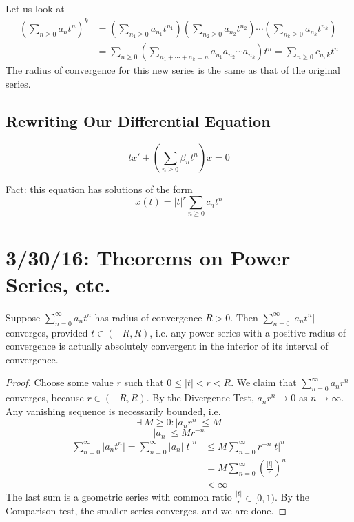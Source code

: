 \documentclass[12pt]{article}
\begin{document}
Let us look at \[ 
\begin{aligned}
\left(\sum_{n\ge0}a_nt^n\right)^k &= \left(\sum_{n_1\ge0}a_{n_1}t^{n_1}\right)\left(\sum_{n_2\ge0}a_{n_2}t^{n_2}\right)\cdots\left(\sum_{n_k\ge0}a_{n_k}t^{n_k}\right) \\
&= \sum_{n\ge 0}\left(\sum_{n_1 + \cdots + n_k = n}a_{n_1}a_{n_2}\cdots a_{n_k}\right)t^n = \sum_{n \ge 0}c_{n,k}t^n
\end{aligned}
\]
The radius of convergence for this new series is the same as that of the original series.

\subsection{Rewriting Our Differential Equation}
\[ tx' + \left(\sum_{n\ge0}\beta_nt^n\right)x = 0 \]

Fact: this equation has solutions of the form \[ x(t) = |t|^r\sum_{n\ge0}c_nt^n \]

\section{3/30/16: Theorems on Power Series, etc.}
\begin{theorem}
Suppose $\displaystyle\sum_{n=0}^{\infty}a_nt^n$ has radius of convergence $R > 0$. Then $\displaystyle\sum_{n=0}^{\infty}|a_nt^n|$ converges, provided $t \in (-R,R)$, i.e. any power series with a positive radius of convergence is actually absolutely convergent in the interior of its interval of convergence.
\end{theorem}

\begin{proof}
Choose some value $r$ such that $0 \le |t| < r < R$. We claim that $\displaystyle\sum_{n=0}^{\infty}a_nr^n$ converges, because $r \in (-R,R)$. By the Divergence Test, $a_nr^n \to 0$ as $n \to \infty$. Any vanishing sequence is necessarily bounded, i.e. \[ \exists \ M \ge 0: |a_nr^n| \le M \]
\[ |a_n| \le Mr^{-n} \]
\[ 
\begin{aligned}
\sum_{n=0}^{\infty}|a_nt^n| = \sum_{n=0}^{\infty}|a_n||t|^n &\le M\sum_{n=0}^{\infty}r^{-n}|t|^n \\
&= M\sum_{n=0}^{\infty}\left(\frac{|t|}{r}\right)^n \\
&< \infty
\end{aligned}
\]
The last sum is a geometric series with common ratio $\frac{|t|}{r} \in [0,1)$. By the Comparison test, the smaller series converges, and we are done.
\end{proof}
\end{document}
